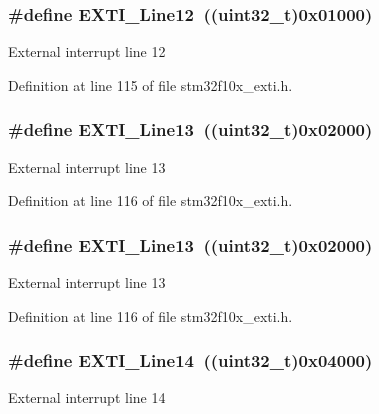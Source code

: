 \subsubsection[{\texorpdfstring{E\+X\+T\+I\+\_\+\+Line12}{EXTI_Line12}}]{\setlength{\rightskip}{0pt plus 5cm}\#define E\+X\+T\+I\+\_\+\+Line12~(({\bf uint32\+\_\+t})0x01000)}\hypertarget{group___e_x_t_i___lines_gab73a0a31f1814118955099b9dd3bdfef}{}\label{group___e_x_t_i___lines_gab73a0a31f1814118955099b9dd3bdfef}
External interrupt line 12 

Definition at line 115 of file stm32f10x\+\_\+exti.\+h.

\subsubsection[{\texorpdfstring{E\+X\+T\+I\+\_\+\+Line13}{EXTI_Line13}}]{\setlength{\rightskip}{0pt plus 5cm}\#define E\+X\+T\+I\+\_\+\+Line13~(({\bf uint32\+\_\+t})0x02000)}\hypertarget{group___e_x_t_i___lines_gae382388ac34b78917a7bd06562e35c42}{}\label{group___e_x_t_i___lines_gae382388ac34b78917a7bd06562e35c42}
External interrupt line 13 

Definition at line 116 of file stm32f10x\+\_\+exti.\+h.

\subsubsection[{\texorpdfstring{E\+X\+T\+I\+\_\+\+Line13}{EXTI_Line13}}]{\setlength{\rightskip}{0pt plus 5cm}\#define E\+X\+T\+I\+\_\+\+Line13~(({\bf uint32\+\_\+t})0x02000)}\hypertarget{group___e_x_t_i___lines_gae382388ac34b78917a7bd06562e35c42}{}\label{group___e_x_t_i___lines_gae382388ac34b78917a7bd06562e35c42}
External interrupt line 13 

Definition at line 116 of file stm32f10x\+\_\+exti.\+h.

\subsubsection[{\texorpdfstring{E\+X\+T\+I\+\_\+\+Line14}{EXTI_Line14}}]{\setlength{\rightskip}{0pt plus 5cm}\#define E\+X\+T\+I\+\_\+\+Line14~(({\bf uint32\+\_\+t})0x04000)}\hypertarget{group___e_x_t_i___lines_ga7b3821ad1b7a00b49c27075688f48101}{}\label{group___e_x_t_i___lines_ga7b3821ad1b7a00b49c27075688f48101}
External interrupt line 14 

